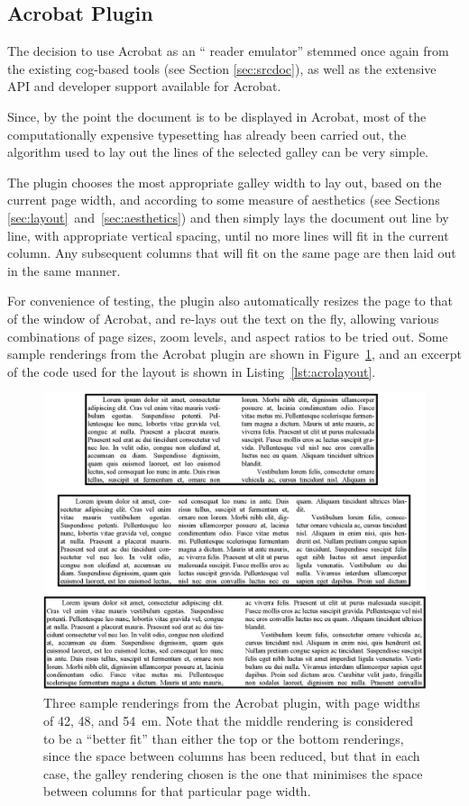 \subsection{Acrobat Plugin}\label{sec:acroplugin}

The decision to use Acrobat as an ``\ebook{} reader emulator'' stemmed once again from the existing \gls{cog}-based tools (see Section \ref{sec:srcdoc}), as well as the extensive API and developer support available for Acrobat.

Since, by the point the document is to be displayed in Acrobat, most of the computationally expensive typesetting has already been carried out, the algorithm used to lay out the lines of the selected galley can be very simple.

The plugin chooses the most appropriate galley width to lay out, based on the current page width, and according to some measure of aesthetics (see Sections \ref{sec:layout}~and~\ref{sec:aesthetics}) and then simply lays the document out line by line, with appropriate vertical spacing, until no more lines will fit in the current column. Any subsequent columns that will fit on the same page are then laid out in the same manner.

For convenience of testing, the plugin also automatically resizes the page to that of the window of Acrobat, and re-lays out the text on the fly, allowing various combinations of page sizes, zoom levels, and aspect ratios to be tried out.
Some sample renderings from the Acrobat plugin are shown in Figure~\ref{fig:renderings}, and an excerpt of the code used for the layout is shown in Listing~\ref{lst:acrolayout}.

\begin{figure}
 \includegraphics[width=\textwidth]{gfx/renderings-bbox}
 \caption[Sample renderings from the Acrobat plugin]{Three sample renderings from the Acrobat plugin, with page widths of 42, 48, and 54~em. Note that the middle rendering is considered to be a ``better fit'' than either the top or the bottom renderings, since the space between columns has been reduced, but that in each case, the galley rendering chosen is the one that minimises the space between columns for that particular page width.}
 \label{fig:renderings}
\end{figure}

